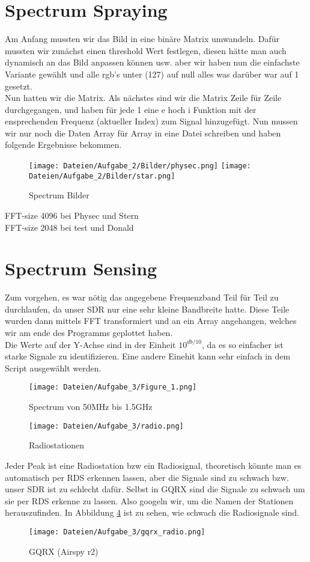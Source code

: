 \documentclass[12pt,a4paper]{article}
\begin{document}
\section{Spectrum Spraying}
Am Anfang mussten wir das Bild in eine binäre Matrix umwandeln. Dafür mussten wir zunächst einen threshold Wert festlegen, diesen hätte man auch dynamisch an das Bild anpassen können usw. aber wir haben nun die einfachste Variante gewählt und alle rgb's unter (127) auf null alles was darüber war auf 1 gesetzt. \\
Nun hatten wir die Matrix. Als nächstes sind wir die Matrix Zeile für Zeile durchgegangen, und haben für jede 1 eine e hoch i Funktion mit der ensprechenden Frequenz (aktueller Index) zum Signal hinzugefügt. Nun mussen wir nur noch die Daten Array für Array in eine Datei schreiben und haben folgende Ergebnisse bekommen. \\
\begin{figure}[H]
\centering
\texttt{[image: Dateien/Aufgabe\_2/Bilder/physec.png]} 
\texttt{[image: Dateien/Aufgabe\_2/Bilder/star.png]} 
\caption{Spectrum Bilder}
\label{fig:2_1}
\end{figure}
FFT-size 4096 bei Physec und Stern\\
FFT-size 2048 bei test und Donald\\
\section{Spectrum Sensing}
Zum vorgehen, es war nötig das angegebene Frequenzband Teil für Teil zu durchlaufen, da unser SDR nur eine sehr kleine Bandbreite hatte. Diese Teile wurden dann mittels FFT transformiert und an ein Array angehangen, welches wir am ende des Programms geplottet haben.\\
Die Werte auf der Y-Achse sind in der Einheit $10^{db/10}$, da es so einfacher ist starke Signale zu identifizieren. Eine andere Einehit kann sehr einfach in dem Script ausgewählt werden.
\begin{figure}[H]
\centering
\texttt{[image: Dateien/Aufgabe\_3/Figure\_1.png]} 
\caption{Spectrum von 50MHz bis 1.5GHz}
\label{fig:3_1}
\end{figure}
\begin{figure}[H]
\centering
\texttt{[image: Dateien/Aufgabe\_3/radio.png]} 
\caption{Radiostationen}
\label{fig:3_3}
\end{figure}
Jeder Peak ist eine Radiostation bzw ein Radiosignal, theoretisch könnte man es automatisch per RDS erkennen lassen, aber die Signale sind zu schwach bzw. unser SDR ist zu schlecht dafür. Selbst in GQRX sind die Signale zu schwach um sie per RDS erkenne zu lassen. Also googeln wir, um die Namen der Stationen herauszufinden.
In Abbildung \ref{fig:3_4} ist zu sehen, wie schwach die Radiosignale sind.
\begin{figure}[H]
\centering
\texttt{[image: Dateien/Aufgabe\_3/gqrx\_radio.png]} 
\caption{GQRX (Airspy r2)}
\label{fig:3_4}
\end{figure}
\end{document}
